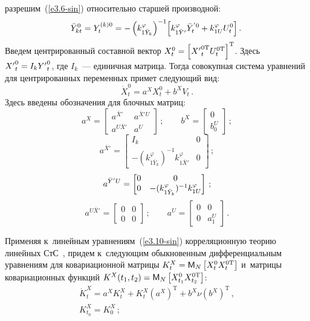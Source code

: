 \begin{multicols}{2}
\begin{equation}
    \end{equation}
разрешим~(\ref{e3.6-sin}) относительно старшей производной:
  \begin{equation}
    \hspace*{-2mm}\bar Y_{kt}^0 = Y_t^{(k)0} =- \left( k_{1\bar Y_k}^\varphi \right)^{-1}\! 
    \lk k_{1\byy}^\varphi {\bar Y}_t^{'0} + k_{1U}^\varphi U_t^0\rk.\!\!
    \label{e3.9-sin}
    \end{equation}
Введем центрированный составной вектор
$ X_t^0 \hm= \lk {X'}_t^{0\mathrm{T}} U_t^{0\mathrm{T}}\rk^{\mathrm{T}}$.
Здесь ${X'}_t^{0}\hm = I_k {Y'}_t^{0}$, где $I_k$~--- единичная мат\-ри\-ца. 
Тогда совокупная система уравнений для центрированных переменных примет следу\-ющий вид:
    \begin{equation}
    \dot X_t^0 = a^X X_t^0 + b^X V_t\,.\label{e3.10-sin}
    \end{equation}
Здесь введены обозначения для блочных матриц:
    $$
    a^X =\begin{bmatrix}
    a^{\bar X'}& a^{\bar X' U}\\
    a^{U\bar X'}& a^U \end{bmatrix}\,; \qquad
    b^X=\begin{bmatrix}
    0\\ b_0^U\end{bmatrix}\,; 
    $$
    $$
    a^{\bar X'} =\begin{bmatrix}
    I_k& 0\\
    -(k_{1\bar Y_k}^\varphi )^{-1} k_{1\bar X'}^\varphi & 0\end{bmatrix}\,;
$$
$$
      a^{{\bar Y'} U} = \begin{bmatrix}
    0& 0\\
    0 &-(k_{1 \bar Y_k}^\varphi )^{-1} k_{1U}^\varphi\end{bmatrix}\,;
    $$
    $$
    a^{U\bar X'} = \begin{bmatrix}
    0&0\\
    0&0\end{bmatrix}\,;\qquad 
        a^U =\begin{bmatrix}
    0&0\\
    0&a_1^U\end{bmatrix}\,.
    $$

Применяя к~линейным уравнениям~(\ref{e3.10-sin}) 
корреляционную теорию линейных СтС~\cite{1-sin, 2-sin}, 
придем к~следующим обыкновенным дифференциальным уравнениям для ковариационной 
матрицы $K_t^X \hm= \mm_N \lk X_t^0 X_t^{0\mathrm{T}}\rk $ и~матрицы ковариационных 
функций $K^X  (t_1, t_2) \hm= \mm_N \lk X_{t_1}^0 X_{t_2}^{0\mathrm{T}}\rk$:
   \begin{multline}
   \dot K_t^X = a^X K_t^X + K_t^X \left(a^X\right)^{\mathrm{T}} + 
   b^X \nu \left(b^X\right)^{\mathrm{T}}\,,\\
 K_{t_0}^X = K_0^X\,;\label{e3.11-sin}\end{multline}
 

\end{multicols}
